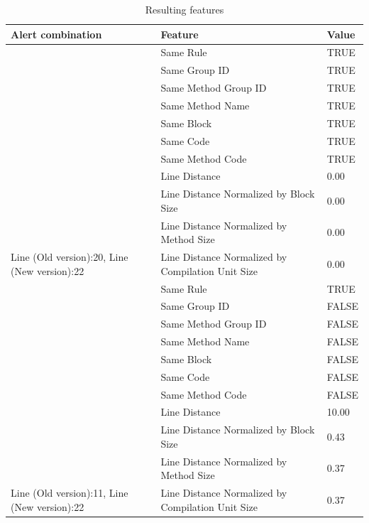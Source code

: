 \documentclass[
]{article}
\begin{document}
\small

\begin{table}[!h]

\caption{\label{tab:unnamed-chunk-8}Resulting features\label{table_features} }
\centering
\begin{tabular}[t]{l|l|l}
\hline
Alert combination & Feature & Value\\
\hline
\rowcolor{gray!6}   & Same Rule & TRUE\\

 & Same Group ID & TRUE\\

\rowcolor{gray!6}   & Same Method Group ID & TRUE\\

 & Same Method Name & TRUE\\

\rowcolor{gray!6}   & Same Block & TRUE\\

 & Same Code & TRUE\\

\rowcolor{gray!6}   & Same Method Code & TRUE\\

 & Line Distance & 0.00\\

\rowcolor{gray!6}   & Line Distance Normalized by Block Size & 0.00\\

 & Line Distance Normalized by Method Size & 0.00\\

\multirow[t]{-11}{*}{\raggedright\arraybackslash Line (Old version):20, Line (New version):22} & Line Distance Normalized by Compilation Unit Size & 0.00\\
\cline{1-3}
 & Same Rule & TRUE\\

\rowcolor{gray!6}   & Same Group ID & FALSE\\

 & Same Method Group ID & FALSE\\

\rowcolor{gray!6}   & Same Method Name & FALSE\\

 & Same Block & FALSE\\

\rowcolor{gray!6}   & Same Code & FALSE\\

 & Same Method Code & FALSE\\

\rowcolor{gray!6}   & Line Distance & 10.00\\

 & Line Distance Normalized by Block Size & 0.43\\

\rowcolor{gray!6}   & Line Distance Normalized by Method Size & 0.37\\

\multirow[t]{-11}{*}{\raggedright\arraybackslash Line (Old version):11, Line (New version):22} & Line Distance Normalized by Compilation Unit Size & 0.37\\
\hline
\end{tabular}
\end{table}
\end{document}
